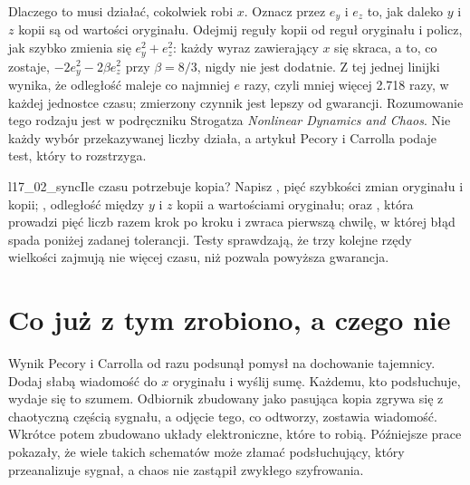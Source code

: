 \begin{rigourbox}
Dlaczego to musi działać, cokolwiek robi $x$. Oznacz przez $e_y$ i $e_z$ to,
jak daleko $y$ i $z$ kopii są od wartości oryginału. Odejmij reguły kopii od
reguł oryginału i policz, jak szybko zmienia się $e_y^2 + e_z^2$: każdy
wyraz zawierający $x$ się skraca, a to, co zostaje, $-2e_y^2 - 2\beta e_z^2$
przy $\beta = 8/3$, nigdy nie jest dodatnie. Z tej jednej linijki wynika, że
odległość maleje co najmniej $e$ razy, czyli mniej więcej \num{2.718} razy,
w każdej jednostce czasu; zmierzony czynnik  jest
lepszy od gwarancji. Rozumowanie tego rodzaju jest w podręczniku Strogatza
\emph{Nonlinear Dynamics and Chaos}. Nie każdy wybór przekazywanej liczby
działa, a artykuł Pecory i Carrolla podaje test, który to rozstrzyga.
\end{rigourbox}

\begin{lab}{l17_02_sync}{Ile czasu potrzebuje kopia?}
Napisz , pięć szybkości zmian oryginału i kopii;
, odległość między $y$ i $z$ kopii a wartościami oryginału; oraz
, która prowadzi pięć liczb razem krok po kroku i zwraca
pierwszą chwilę,
w której błąd spada poniżej zadanej tolerancji. Testy sprawdzają, że trzy
kolejne rzędy wielkości zajmują nie więcej czasu, niż pozwala powyższa
gwarancja.
\end{lab}

\section{Co już z tym zrobiono, a czego nie}
\label{sec:ch17-world}

\noindent
Wynik Pecory i Carrolla od razu podsunął pomysł na dochowanie tajemnicy.
Dodaj słabą wiadomość do $x$ oryginału i wyślij sumę. Każdemu, kto
podsłuchuje, wydaje się to szumem. Odbiornik zbudowany jako pasująca kopia
zgrywa się z chaotyczną częścią sygnału, a odjęcie tego, co odtworzy,
zostawia wiadomość. Wkrótce potem zbudowano układy elektroniczne, które to
robią. Późniejsze prace pokazały, że wiele takich schematów może złamać
podsłuchujący, który przeanalizuje sygnał, a chaos nie zastąpił zwykłego
szyfrowania.

